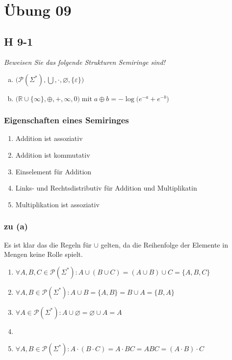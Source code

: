 \documentclass{scrartcl}
\begin{document}
\section{Übung 09}

\subsection{H 9-1}

\textsl{Beweisen Sie das folgende Strukturen \emph{Semiringe} sind!}

\begin{enumerate}[(a)]
    \item $\Big(\mathcal{P}(\Sigma^*), \bigcup, \cdot, \varnothing, \{\varepsilon\} \Big)$
    \item $\Big(\mathbb{R} \cup \{\infty\}, \oplus, +, \infty, 0 \Big) \;\text{mit}\; a \oplus b = -\log\big(e^{-a}+e^{-b}\big)$
\end{enumerate}

\subsubsection{Eigenschaften eines Semiringes}
\begin{enumerate}
    \setlength\itemsep{-1em}
    \item Addition ist assoziativ
    \item Addition ist kommutativ
    \item Einselement für Addition
    \item Links- und Rechtsdistributiv für Addition und Multiplikatin
    \item Multiplikation ist assoziativ
\end{enumerate}

\subsubsection{zu (a)}

\newcommand{\baseset}{\mathcal{P}(\Sigma^*)}
Es ist klar das die Regeln für $\cup$ gelten, da die Reihenfolge der Elemente in Mengen keine Rolle spielt.
\begin{enumerate}
    \item $\forall A, B, C \in \baseset: A \cup (B \cup C) = (A \cup B) \cup C = \{A, B, C\}$
    \item $\forall A, B \in \baseset: A \cup B = \{A, B\} = B \cup A = \{B, A\}$
    \item $\forall A \in \baseset: A \cup \varnothing = \varnothing \cup A = A$
    \item
    \item $\forall A, B \in \baseset: A \cdot (B \cdot C) = A \cdot BC = ABC = (A \cdot B) \cdot C$
\end{enumerate}
\end{document}
